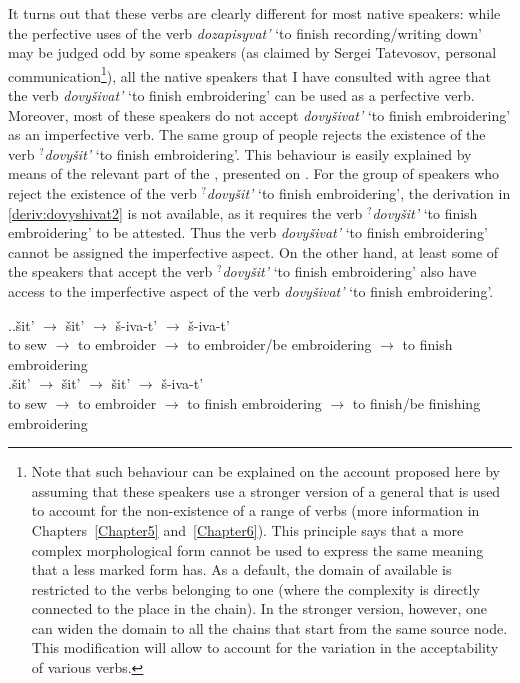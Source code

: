 It turns out that these verbs are clearly different for most native speakers: while the perfective uses of the verb \textit{dozapisyvat'} `to finish recording/writing down' may be judged odd by some speakers (as claimed by Sergei Tatevosov, personal communication\footnote{Note that such behaviour can be explained on the account proposed here by assuming that these speakers use a stronger version of a general  that is used to account for the non-existence of a range of verbs (more information in Chapters~\ref{Chapter5} and~\ref{Chapter6}). This principle says that a more complex morphological form cannot be used to express the same meaning that a less marked form has. As a default, the domain of available  is restricted to the verbs belonging to one  (where the complexity is directly connected to the place in the chain). In the stronger version, however, one can widen the domain to all the chains that start from the same source node. This modification will allow to account for the variation in the acceptability of various verbs.}), all the native speakers that I have consulted with agree that the verb \textit{dovy\v{s}ivat'} `to finish embroidering' can be used as a perfective verb. Moreover, most of these speakers do not accept \textit{dovy\v{s}ivat'} `to finish embroidering' as an imperfective verb. The same group of people rejects the existence of the verb $^?$\textit{dovy\v{s}it'}\textsuperscript{\PF} `to finish embroidering'. This behaviour is easily explained by means of the relevant part of the , presented on . For the group of speakers who reject the existence of the verb $^?$\textit{dovy\v{s}it'}\textsuperscript{\PF} `to finish embroidering', the derivation in \ref{deriv:dovyshivat2} is not available, as it requires the verb $^?$\textit{dovy\v{s}it'}\textsuperscript{\PF} `to finish embroidering' to be attested. Thus the verb \textit{dovy\v{s}ivat'} `to finish embroidering' cannot be assigned the imperfective aspect. On the other hand, at least some of the speakers that accept the verb $^?$\textit{dovy\v{s}it'}\textsuperscript{\PF} `to finish embroidering' also have access to the imperfective aspect of the verb \textit{dovy\v{s}ivat'} `to finish embroidering'.

\ex.\label{deriv:dovyshivat}\ag.\label{deriv:dovyshivat1}\v{s}it'\textsuperscript{\IPF} $\rightarrow$ \v{s}it'\textsuperscript{\PF} $\rightarrow$ \v{s}-iva-t'\textsuperscript{\IPF} $\rightarrow$ \v{s}-iva-t'\textsuperscript{\PF}\\
{to sew} $\rightarrow$ {to embroider} $\rightarrow$ {to embroider/be embroidering} $\rightarrow$ {to finish embroidering}\\
\bg.\label{deriv:dovyshivat2}\v{s}it'\textsuperscript{\IPF} $\rightarrow$ \v{s}it'\textsuperscript{\PF} $\rightarrow$ \v{s}it'\textsuperscript{\PF} $\rightarrow$ \v{s}-iva-t'\textsuperscript{\IPF}\\
{to sew} $\rightarrow$ {to embroider} $\rightarrow$ {to finish embroidering} $\rightarrow$ {to finish/be finishing embroidering}\\

